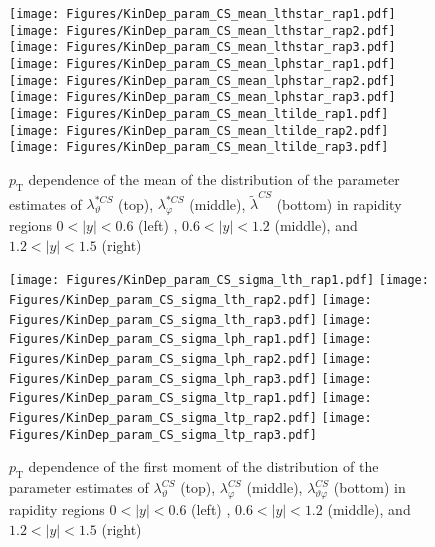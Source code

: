 \documentclass[12pt]{article}
\newcommand{\pT}{p_\mathrm{T}}
\newcommand{\absy}{\left |  y \right |}
\newcommand{\lamthCS}{\lambda^{\scriptscriptstyle CS}_\vartheta}
\newcommand{\lamphCS}{\lambda^{\scriptscriptstyle CS}_\varphi}
\newcommand{\lamthphCS}{\lambda^{\scriptscriptstyle CS}_{\vartheta \varphi}}
\newcommand{\lamtildeCS}{\tilde{\lambda}^{\scriptscriptstyle CS}}
\newcommand{\lamthstarCS}{\lambda^{* \scriptscriptstyle CS}_\vartheta}
\newcommand{\lamphstarCS}{\lambda^{* \scriptscriptstyle CS}_\varphi}
\begin{document}
\begin{figure}[htbp]
\centering
\texttt{[image: Figures/KinDep\_param\_CS\_mean\_lthstar\_rap1.pdf]}
\texttt{[image: Figures/KinDep\_param\_CS\_mean\_lthstar\_rap2.pdf]}
\texttt{[image: Figures/KinDep\_param\_CS\_mean\_lthstar\_rap3.pdf]}
\texttt{[image: Figures/KinDep\_param\_CS\_mean\_lphstar\_rap1.pdf]}
\texttt{[image: Figures/KinDep\_param\_CS\_mean\_lphstar\_rap2.pdf]}
\texttt{[image: Figures/KinDep\_param\_CS\_mean\_lphstar\_rap3.pdf]}
\texttt{[image: Figures/KinDep\_param\_CS\_mean\_ltilde\_rap1.pdf]}
\texttt{[image: Figures/KinDep\_param\_CS\_mean\_ltilde\_rap2.pdf]}
\texttt{[image: Figures/KinDep\_param\_CS\_mean\_ltilde\_rap3.pdf]}
\caption{$\pT$ dependence of the mean of the distribution of the parameter estimates of $\lamthstarCS$ (top), $\lamphstarCS$ (middle), $\lamtildeCS$ (bottom) in rapidity regions $0<\absy<0.6$ (left) , $0.6<\absy<1.2$ (middle), and $1.2<\absy<1.5$ (right)}
\end{figure}
\clearpage


\begin{figure}[htbp]
\centering
\texttt{[image: Figures/KinDep\_param\_CS\_sigma\_lth\_rap1.pdf]}
\texttt{[image: Figures/KinDep\_param\_CS\_sigma\_lth\_rap2.pdf]}
\texttt{[image: Figures/KinDep\_param\_CS\_sigma\_lth\_rap3.pdf]}
\texttt{[image: Figures/KinDep\_param\_CS\_sigma\_lph\_rap1.pdf]}
\texttt{[image: Figures/KinDep\_param\_CS\_sigma\_lph\_rap2.pdf]}
\texttt{[image: Figures/KinDep\_param\_CS\_sigma\_lph\_rap3.pdf]}
\texttt{[image: Figures/KinDep\_param\_CS\_sigma\_ltp\_rap1.pdf]}
\texttt{[image: Figures/KinDep\_param\_CS\_sigma\_ltp\_rap2.pdf]}
\texttt{[image: Figures/KinDep\_param\_CS\_sigma\_ltp\_rap3.pdf]}
\caption{$\pT$ dependence of the first moment of the distribution of the parameter estimates of $\lamthCS$ (top), $\lamphCS$ (middle), $\lamthphCS$ (bottom) in rapidity regions $0<\absy<0.6$ (left) , $0.6<\absy<1.2$ (middle), and $1.2<\absy<1.5$ (right)}
\end{figure}
\clearpage
\end{document}

